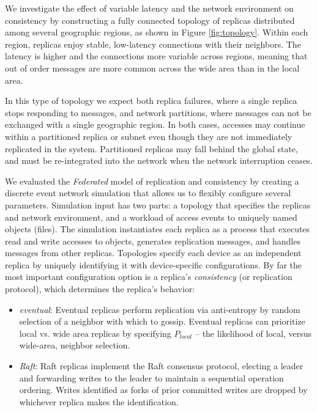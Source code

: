 \documentclass[10pt,conference,letterpaper]{IEEEtran}
\begin{document}
We investigate the effect of variable latency and the network environment on consistency by
constructing a fully connected topology of replicas distributed among several
geographic regions, as shown in Figure \ref{fig:topology}.
Within each region, replicas enjoy stable, low-latency connections with their
neighbors.
The latency is higher and the connections more variable across regions, meaning that
out of order messages are more common across the wide area than in the local area.

In this type of topology we expect both replica failures, where a single
replica stops responding to messages, and network partitions, where messages
can not be exchanged with a single geographic region.
In both cases, accesses may continue within a partitioned replica or subnet
even though they are not immediately replicated in the system.
Partitioned replicas may fall behind the global state, and must be
re-integrated into the network when the network interruption ceases.


We evaluated the \emph{Federated} model of replication and consistency by creating a
discrete event network simulation that allows us to flexibly configure several parameters.
Simulation input has two parts: a topology that specifies the replicas and
network environment, and a workload of access events to uniquely named objects
(files).
The simulation instantiates each replica as a process that executes read and
write accesses to objects, generates replication messages, and
handles messages from other replicas.
Topologies specify each device as an independent replica by uniquely identifying it
with device-specific configurations.
By far the most important configuration option is a replica's \textit{consistency} (or replication
protocol), which determines the replica's behavior:
\begin{itemize}
    \item \emph{eventual}: Eventual replicas perform replication via anti-entropy by random
      selection of a neighbor with which to gossip. Eventual  replicas can prioritize
      local vs. wide area replicas by specifying $P_{local}$ -- the likelihood
      of local, versus wide-area, neighbor selection.
    \item \emph{Raft}: Raft replicas implement the Raft consensus protocol, electing a
      leader and forwarding writes to the leader to maintain a sequential
      operation ordering. 
      Writes identified as forks of prior committed writes are dropped by
      whichever replica makes the identification.
\end{itemize}
\end{document}
